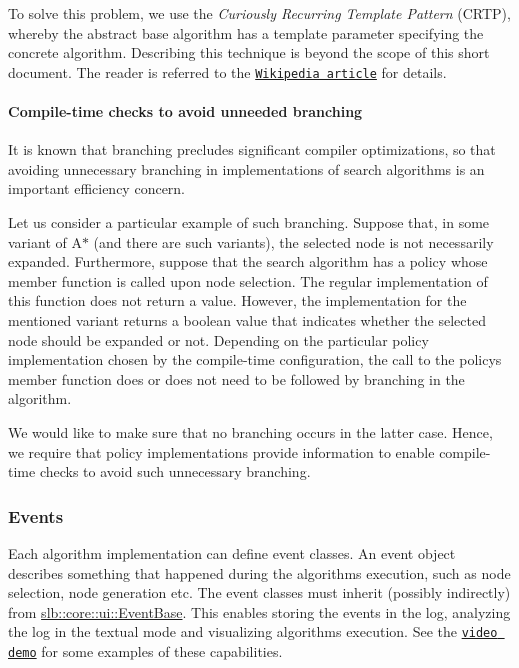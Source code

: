 To solve this problem, we use the {\itshape Curiously Recurring Template Pattern} (C\+R\+TP), whereby the abstract base algorithm has a template parameter specifying the concrete algorithm. Describing this technique is beyond the scope of this short document. The reader is referred to the \href{https://en.wikipedia.org/wiki/Curiously_recurring_template_pattern}{\tt Wikipedia article} for details.\hypertarget{index_s-branching}{}\paragraph{Compile-\/time checks to avoid unneeded branching}\label{index_s-branching}
It is known that branching precludes significant compiler optimizations, so that avoiding unnecessary branching in implementations of search algorithms is an important efficiency concern.

Let us consider a particular example of such branching. Suppose that, in some variant of A$\ast$ (and there are such variants), the selected node is not necessarily expanded. Furthermore, suppose that the search algorithm has a policy whose member function is called upon node selection. The regular implementation of this function does not return a value. However, the implementation for the mentioned variant returns a boolean value that indicates whether the selected node should be expanded or not. Depending on the particular policy implementation chosen by the compile-\/time configuration, the call to the policy\textquotesingle{}s member function does or does not need to be followed by branching in the algorithm.

We would like to make sure that no branching occurs in the latter case. Hence, we require that policy implementations provide information to enable compile-\/time checks to avoid such unnecessary branching.\hypertarget{index_s-events}{}\subsubsection{Events}\label{index_s-events}
Each algorithm implementation can define event classes. An event object describes something that happened during the algorithm\textquotesingle{}s execution, such as node selection, node generation etc. The event classes must inherit (possibly indirectly) from \hyperlink{structslb_1_1core_1_1ui_1_1EventBase}{slb\+::core\+::ui\+::\+Event\+Base}. This enables storing the events in the log, analyzing the log in the textual mode and visualizing algorithm\textquotesingle{}s execution. See the \href{https://youtu.be/cElxLWve1Zw}{\tt video demo} for some examples of these capabilities.

